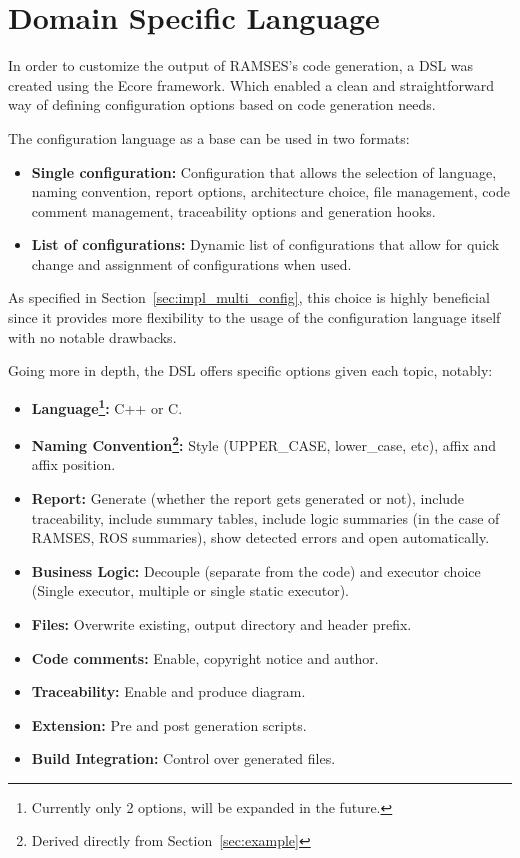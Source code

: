 \section{Domain Specific Language}
\label{sec:dsl}

In order to customize the output of \gls{RAMSES}'s code generation, a \gls{DSL} was created using the Ecore framework. Which enabled a clean and straightforward way of defining configuration options based on code generation needs.

The configuration language as a base can be used in two formats:

\begin{itemize}  
	\item \textbf{Single configuration: } Configuration that allows the selection of language, naming convention, report options, architecture choice, file management, code comment management, traceability options and generation hooks.
	\item \textbf{List of configurations: } Dynamic list of configurations that allow for quick change and assignment of configurations when used.
\end{itemize}


As specified in Section~\ref{sec:impl_multi_config}, this choice is highly beneficial since it provides more flexibility to the usage of the configuration language itself with no notable drawbacks.

Going more in depth, the \gls{DSL} offers specific options given each topic, notably:

\begin{itemize}  
	\item \textbf{Language\footnote{Currently only 2 options, will be expanded in the future.}: } C++ or C.
	\item \textbf{Naming Convention\footnote{Derived directly from Section~\ref{sec:example}}: } Style (UPPER\_CASE, lower\_case, etc), affix and affix position.
	\item \textbf{Report: } Generate (whether the report gets generated or not), include traceability, include summary tables, include logic summaries (in the case of \gls{RAMSES}, \gls{ROS} summaries), show detected errors and open automatically.
	\item \textbf{Business Logic: } Decouple (separate from the code) and executor choice (Single executor, multiple or single static executor).
	\item \textbf{Files: } Overwrite existing, output directory and header prefix.
	\item \textbf{Code comments: } Enable, copyright notice and author.
	\item \textbf{Traceability: } Enable and produce diagram.
	\item \textbf{Extension: } Pre and post generation scripts.
	\item \textbf{Build Integration: } Control over generated files.
\end{itemize}


